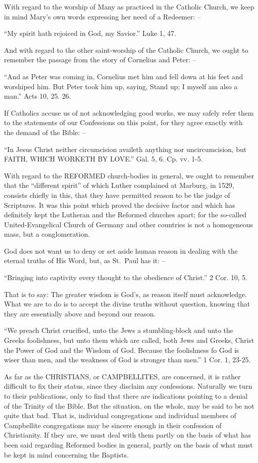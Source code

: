\documentclass[
]{book}
\begin{document}
With regard to the worship of Many as practiced in the Catholic Church, we keep in mind Mary's own words expressing her need of a Redeemer: --

``My spirit hath rejoiced in God, my Savior.'' Luke 1, 47.

And with regard to the other saint-worship of the Catholic Church, we ought to remember the passage from the story of Cornelius and Peter: --

``And as Peter was coming in, Cornelius met him and fell down at his feet and worshiped him. But Peter took him up, saying, Stand up; I myself am also a man.'' Acts 10, 25. 26.

If Catholics accuse us of not acknowledging good works, we may safely refer them to the statements of our Confessions on this point, for they agree exactly with the demand of the Bible: --

``In Jesus Christ neither circumcision availeth anything nor uncircumcision, but FAITH, WHICH WORKETH BY LOVE.'' Gal. 5, 6. Cp. vv. 1-5.

With regard to the REFORMED church-bodies in general, we ought to remember that the ``different spirit'' of which Luther complained at Marburg, in 1529, consists chiefly in this, that they have permitted reason to be the judge of Scriptures. It was this point which proved the decisive factor and which has definitely kept the Lutheran and the Reformed churches apart; for the so-called United-Evangelical Church of Germany and other countries is not a homogeneous mass, but a conglomeration.

God does not want us to deny or set aside human reason in dealing with the eternal truths of His Word, but, as St.~Paul has it: --

``Bringing into captivity every thought to the obedience of Christ.'' 2 Cor. 10, 5.

That is to say: The greater wisdom is God's, as reason itself must acknowledge. What we are to do is to accept the divine truths without question, knowing that they are essentially above and beyond our reason.

``We preach Christ crucified, unto the Jews a stumbling-block and unto the Greeks foolishness, but unto them which are called, both Jews and Greeks, Christ the Power of God and the Wisdom of God. Because the foolishness fo God is wiser than men, and the weakness of God is stronger than men.'' 1 Cor. 1, 23-25.

As far as the CHRISTIANS, or CAMPBELLITES, are concerned, it is rather difficult to fix their status, since they disclaim any confessions. Naturally we turn to their publications, only to find that there are indications pointing to a denial of the Trinity of the Bible. But the situation, on the whole, may be said to be not quite that bad. That is, individual congregations and individual members of Campbellite congregations may be sincere enough in their confession of Christianity. If they are, we must deal with them partly on the basis of what has been said regarding Reformed bodies in general, partly on the basis of what must be kept in mind concerning the Baptists.
\end{document}
